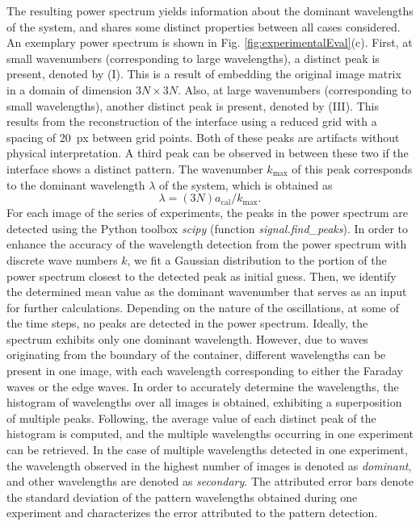 \documentclass{jfm_arxiv}
\begin{document}
The resulting power spectrum yields information about the dominant wavelengths of the system, and shares some distinct properties between all cases considered. An exemplary power spectrum is shown in Fig. \ref{fig:experimentalEval}(c). First, at small wavenumbers (corresponding to large wavelengths), a distinct peak is present, denoted by (I). This is a result of embedding the original image matrix in a domain of dimension $3N \times 3N$. Also, at large wavenumbers (corresponding to small wavelengths), another distinct peak is present, denoted by (III). This results from the reconstruction of the interface using a reduced grid with a spacing of \SI{20}{px} between grid points. Both of these peaks are artifacts without physical interpretation. A third peak can be observed in between these two if the interface shows a distinct pattern. The wavenumber $k_\text{max}$ of this peak corresponds to the dominant wavelength $\lambda$ of the system, which is obtained as
\begin{equation}
\lambda = (3N) a_\text{cal} / k_\text{max}.
\end{equation}
For each image of the series of experiments, the peaks in the power spectrum are detected using the Python toolbox \textit{scipy} (function \textit{signal.find\_peaks}).
In order to enhance the accuracy of the wavelength detection from the power spectrum with discrete wave numbers $k$, we fit a Gaussian distribution to the portion of the power spectrum closest to the detected peak as initial guess. Then, we identify the determined mean value as the dominant wavenumber that serves as an input for further calculations.
Depending on the nature of the oscillations, at some of the time steps, no peaks are detected in the power spectrum.
%
Ideally, the spectrum exhibits only one dominant wavelength. However, due to waves originating from the boundary of the container, different wavelengths can be present in one image, with each wavelength corresponding to either the Faraday waves or the edge waves. 
In order to accurately determine the wavelengths, the histogram of wavelengths over all images is obtained, exhibiting a superposition of multiple peaks. Following, the average value of each distinct peak of the histogram is computed, and the multiple wavelengths occurring in one experiment can be retrieved. In the case of multiple wavelengths detected in one experiment, the wavelength observed in the highest number of images is denoted as \textit{dominant}, and other wavelengths are denoted as \textit{secondary}. The attributed error bars denote the standard deviation of the pattern wavelengths obtained during one experiment and characterizes the error attributed to the pattern detection.
\end{document}
